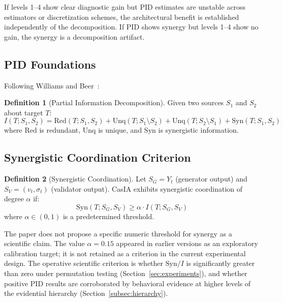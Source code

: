 \documentclass[11pt,a4paper]{article}
\theoremstyle{definition}
\newtheorem{definition}{Definition}[section]
\begin{document}
If levels 1--4 show clear diagnostic gain but PID estimates are unstable across estimators or discretization schemes, the architectural benefit is established independently of the decomposition. If PID shows synergy but levels 1--4 show no gain, the synergy is a decomposition artifact.

\subsection{PID Foundations}

Following Williams and Beer~\cite{williams2010pid}:

\begin{definition}[Partial Information Decomposition]
\label{def:pid}
Given two sources $S_1$ and $S_2$ about target $T$:
\begin{equation}
I(T; S_1, S_2) = \mathrm{Red}(T; S_1, S_2) + \mathrm{Unq}(T; S_1 \setminus S_2) + \mathrm{Unq}(T; S_2 \setminus S_1) + \mathrm{Syn}(T; S_1, S_2)
\end{equation}
where $\mathrm{Red}$ is redundant, $\mathrm{Unq}$ is unique, and $\mathrm{Syn}$ is synergistic information.
\end{definition}

\subsection{Synergistic Coordination Criterion}

\begin{definition}[Synergistic Coordination]
\label{def:syncoord}
Let $S_G = Y_t$ (generator output) and $S_V = (v_t, \sigma_t)$ (validator output). CasIA exhibits synergistic coordination of degree $\alpha$ if:
\begin{equation}
\mathrm{Syn}(T; S_G, S_V) \geq \alpha \cdot I(T; S_G, S_V)
\end{equation}
where $\alpha \in (0,1)$ is a predetermined threshold.
\end{definition}

The paper does not propose a specific numeric threshold for synergy as a scientific claim. The value $\alpha = 0.15$ appeared in earlier versions as an exploratory calibration target; it is not retained as a criterion in the current experimental design. The operative scientific criterion is whether $\mathrm{Syn}/I$ is significantly greater than zero under permutation testing (Section~\ref{sec:experiments}), and whether positive PID results are corroborated by behavioral evidence at higher levels of the evidential hierarchy (Section~\ref{subsec:hierarchy}).
\end{document}
